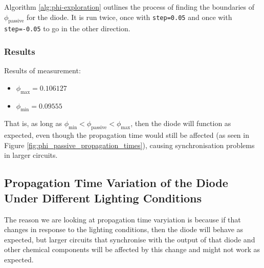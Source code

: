 Algorithm \ref{alg:phi-exploration} outlines the process of finding the boundaries of $\phi_{\text{passive}}$ for the diode. It is run twice, 
once with \verb|step=0.05| and once with \verb|step=-0.05| to go in the other direction.

\subsubsection*{Results}

Results of measurement: 
\begin{itemize}
    \item $\phi_{\text{max}} = 0.106127$
    \item $\phi_{\text{min}} = 0.09555$
\end{itemize}

That is, as long as $\phi_{\text{min}} < \phi_{\text{passive}} < \phi_{\text{max}}$, then the diode will function as expected, even though the propagation time would still be affected (as seen in Figure \ref{fig:phi_passive_propagation_times}), causing synchronisation problems in larger circuits.


\subsection{Propagation Time Variation of the Diode Under Different Lighting Conditions}\label{sec:propagation-time-variation}
The reason we are looking at propagation time varyiation is because if that changes in response to the lighting conditions,
then the diode will behave as expected, but larger circuits that synchronise with the output of that diode and other chemical components
will be affected by this change and might not work as expected.
